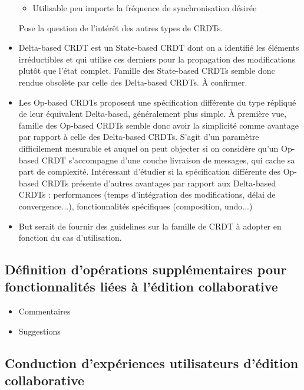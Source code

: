 \documentclass[12pt]{thesul}
\theoremstyle{definition}
\begin{document}
\begin{itemize}
\begin{itemize}
      \item Utilisable peu importe la fréquence de synchronisation désirée
    \end{itemize}
    Pose la question de l'intérêt des autres types de CRDTs.
  \item Delta-based CRDT est un State-based CRDT dont on a identifié les éléments irréductibles et qui utilise ces derniers pour la propagation des modifications plutôt que l'état complet.
    Famille des State-based CRDTs semble donc rendue obsolète par celle des Delta-based CRDTs.
    À confirmer.
  \item Les Op-based CRDTs proposent une spécification différente du type répliqué de leur équivalent Delta-based, généralement plus simple.
    À première vue, famille des Op-based CRDTs semble donc avoir la simplicité comme avantage par rapport à celle des Delta-based CRDTs.
    S'agit d'un paramètre difficilement mesurable et auquel on peut objecter si on considère qu'un Op-based CRDT s'accompagne d'une couche livraison de messages, qui cache sa part de complexité.
    Intéressant d'étudier si la spécification différente des Op-based CRDTs présente d'autres avantages par rapport aux Delta-based CRDTs : performances (temps d'intégration des modifications, délai de convergence...), fonctionnalités spécifiques (composition, undo...)
  \item But serait de fournir des guidelines sur la famille de CRDT à adopter en fonction du cas d'utilisation.
\end{itemize}

\subsection{Définition d'opérations supplémentaires pour fonctionnalités liées à l'édition collaborative}

\begin{itemize}
  \item Commentaires
  \item Suggestions
\end{itemize}

\subsection{Conduction d'expériences utilisateurs d'édition collaborative}
\end{document}
